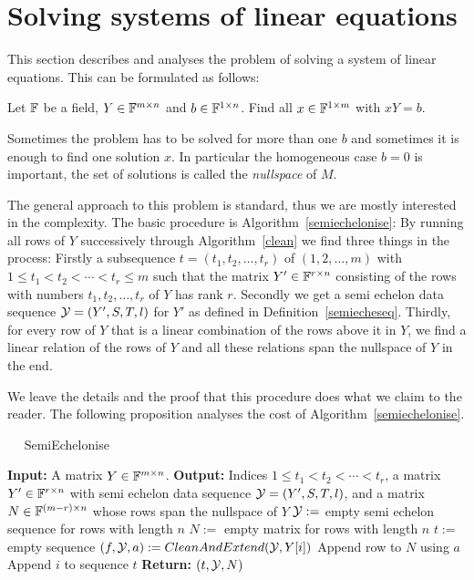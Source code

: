 \section{Solving systems of linear equations}
\label{sec:syslineq}

This section describes and analyses the problem of solving a system
of linear equations. This can be formulated as follows:

Let $\mathbb{F}$ be a field, $Y \in \mathbb{F}^{m \times n}$ and $b \in \mathbb{F}^{1 \times n}$.
Find all $x \in \mathbb{F}^{1 \times m}$ with $xY = b$.

Sometimes the problem has to be solved for more than one $b$ and sometimes
it is enough to find one solution $x$. In particular the homogeneous case 
$b=0$ is important, the set of solutions is called the \emph{nullspace}
of $M$.

The general approach to this problem is standard, thus we are mostly
interested in the complexity. The basic procedure is
Algorithm~\ref{semiechelonise}: By running
all rows of $Y$ successively through Algorithm~\ref{clean} we
find three things in the process: Firstly a subsequence
$t=(t_1,t_2, \ldots, t_{r})$ of $(1,2,\ldots, m)$ with
$1 \le t_1 < t_2 < \cdots < t_r \le m$ such that the matrix
$Y' \in \mathbb{F}^{r \times n}$ consisting of the rows with numbers 
$t_1, t_2, \ldots, t_r$ of $Y$ has rank $r$. Secondly we get a
semi echelon data sequence $\mathcal{Y} = (Y',S,T,l)$ for $Y'$ as defined
in Definition~\ref{semiecheseq}. Thirdly, for every row of $Y$ that
is a linear combination of the rows above it in $Y$, we find a linear 
relation of the rows of $Y$ and all these relations span the nullspace
of $Y$ in the end.

We leave the details and the proof that this procedure does what
we claim to the reader. The following proposition analyses the cost
of Algorithm~\ref{semiechelonise}.

\begin{algorithm}
\caption{$\quad$ \sc SemiEchelonise}
\label{semiechelonise}
\begin{algorithmic}
\STATE \textbf{Input:} A matrix $Y \in \mathbb{F}^{m \times n}$.
\STATE \textbf{Output:} Indices $1 \le t_1 < t_2 < \cdots < t_r$,
a matrix $Y' \in \mathbb{F}^{r \times n}$ with semi echelon data sequence
\STATE \mbox{}
$\mathcal{Y} = (Y',S,T,l)$, and a matrix $N \in \mathbb{F}^{(m-r) \times n}$
whose rows span the nullspace of $Y$
\STATE $\mathcal{Y} := $ empty semi echelon sequence for rows with length $n$
\STATE $N := $ empty matrix for rows with length $n$
\STATE $t := $ empty sequence
    \STATE $(f,\calY,a) := \textsc{CleanAndExtend}(\calY,Y[i])$
        \STATE Append row to $N$ using $a$
    \ELSE
        \STATE Append $i$ to sequence $t$
    \ENDIF
\ENDFOR
\STATE \textbf{Return:} $(t,\mathcal{Y},N)$
\end{algorithmic}
\end{algorithm}


